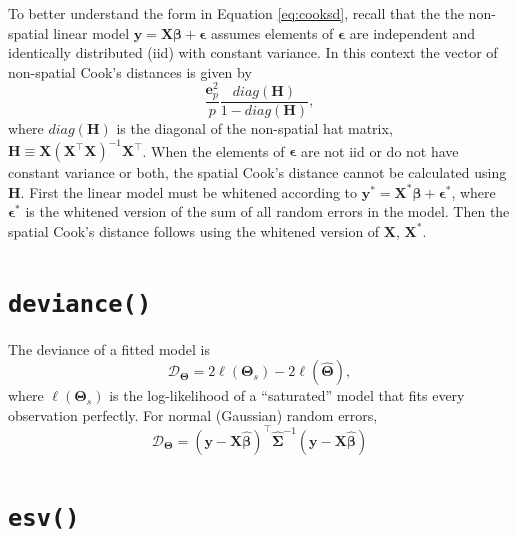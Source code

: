 \documentclass[10pt,letterpaper]{article}
\begin{document}
To better understand the form in Equation \ref{eq:cooksd}, recall that
the the non-spatial linear model
\(\mathbf{y} = \mathbf{X} \boldsymbol{\beta} + \boldsymbol{\epsilon}\)
assumes elements of \(\boldsymbol{\epsilon}\) are independent and
identically distributed (iid) with constant variance. In this context
the vector of non-spatial Cook's distances is given by \begin{equation*}
\frac{\mathbf{e}_p^2}{p}\frac{diag(\mathbf{H})}{1 - diag(\mathbf{H})},
\end{equation*} where \(diag(\mathbf{H})\) is the diagonal of the
non-spatial hat matrix,
\(\mathbf{H} \equiv \mathbf{X} (\mathbf{X}^{\top} \mathbf{X})^{-1} \mathbf{X}^{\top}\).
When the elements of \(\boldsymbol{\epsilon}\) are not iid or do not
have constant variance or both, the spatial Cook's distance cannot be
calculated using \(\mathbf{H}\). First the linear model must be whitened
according to
\(\mathbf{y}^* = \mathbf{X}^* \boldsymbol{\beta} + \boldsymbol{\epsilon}^*\),
where \(\boldsymbol{\epsilon}^*\) is the whitened version of the sum of
all random errors in the model. Then the spatial Cook's distance follows
using the whitened version of \(\mathbf{X}\), \(\mathbf{X}^*\).

\hypertarget{sec:deviance}{%
\section{\texorpdfstring{\texttt{deviance()}}{deviance()}}\label{sec:deviance}}

The deviance of a fitted model is \begin{equation*}
\mathcal{D}_{\boldsymbol{\Theta}} = 2\ell(\boldsymbol{\Theta}_s) - 2\ell(\boldsymbol{\hat{\Theta}}),
\end{equation*} where \(\ell(\boldsymbol{\Theta}_s)\) is the
log-likelihood of a ``saturated'' model that fits every observation
perfectly. For normal (Gaussian) random errors, \begin{equation*}
\mathcal{D}_{\boldsymbol{\Theta}} = (\mathbf{y} - \mathbf{X} \hat{\boldsymbol{\beta}})^\top \hat{\boldsymbol{\Sigma}}^{-1} (\mathbf{y} - \mathbf{X} \hat{\boldsymbol{\beta}})
\end{equation*}

\hypertarget{sec:esv}{%
\section{\texorpdfstring{\texttt{esv()}}{esv()}}\label{sec:esv}}
\end{document}
